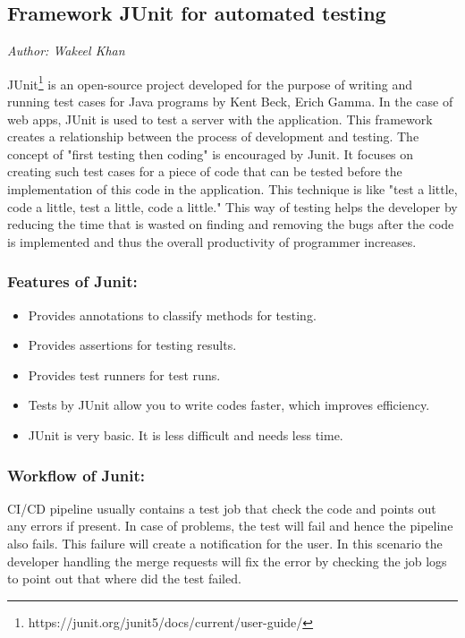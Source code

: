 

\subsection{Framework JUnit for automated testing}\label{sec:Framework JUnit}

\textit{Author: Wakeel Khan}

JUnit\footnote{https://junit.org/junit5/docs/current/user-guide/} is an open-source project developed for the purpose of writing and running test
cases for Java programs by Kent Beck, Erich Gamma. In the case of web apps, JUnit is used to test a server with the application. This framework creates a relationship between
the process of development and testing.
The concept of "first testing then coding" is encouraged by Junit. It focuses on creating
such test cases for a piece of code that can be tested before the implementation of this
code in the application. This technique is like "test a little, code a little, test a little,
code a little." This way of testing helps the developer by reducing the time that is wasted
on finding and removing the bugs after the code is implemented and thus the overall
productivity of programmer increases.

\subsubsection{Features of Junit:}
\begin{itemize}
\item Provides annotations to classify methods for testing.  
\item Provides assertions for testing results.
\item Provides test runners for test runs.
\item Tests by JUnit allow you to write codes faster, which improves efficiency.
\item JUnit is very basic. It is less difficult and needs less time.
\end{itemize}


\subsubsection{Workflow of Junit:}

CI/CD pipeline usually contains a test job that check the code and points out any errors if present. In case of problems, the test will fail and hence the pipeline also fails. This failure will create a notification for the user. In this scenario the developer handling the merge requests will fix the error by checking the job logs to point out that where did the test failed.

